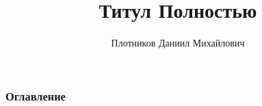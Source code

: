 \documentclass[
	11pt
	   t,
	aspectratio=169
]{beamer}
\title[Титул кратко]{Титул Полностью}
\author[Плотников Д.М. ]{Плотников Даниил Михайлович}
\institute[СПбГУ]{Санкт-Петербургский Государственный Университет}
\date[Год]{}
\begin{document}
\begin{frame}
	\titlepage
\end{frame}

\begin{frame}
	\frametitle{Оглавление}
	\tableofcontents 
\end{frame}



\end{document}
